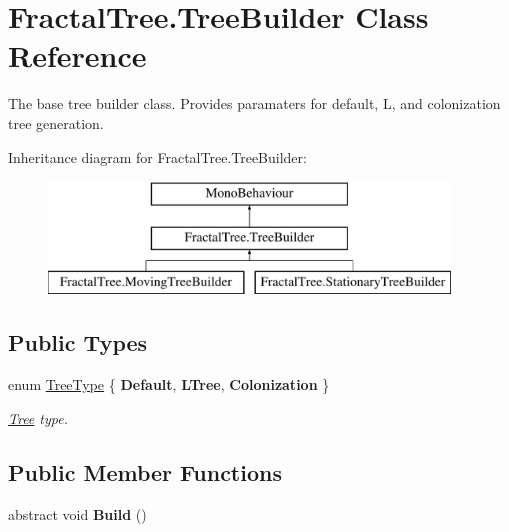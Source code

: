 \hypertarget{class_fractal_tree_1_1_tree_builder}{}\section{Fractal\+Tree.\+Tree\+Builder Class Reference}
\label{class_fractal_tree_1_1_tree_builder}


The base tree builder class. Provides paramaters for default, L, and colonization tree generation.  


Inheritance diagram for Fractal\+Tree.\+Tree\+Builder\+:\begin{figure}[H]
\begin{center}
\leavevmode
\includegraphics[height=3.000000cm]{class_fractal_tree_1_1_tree_builder}
\end{center}
\end{figure}
\subsection*{Public Types}
\begin{DoxyCompactItemize}
\item 
enum \hyperlink{class_fractal_tree_1_1_tree_builder_a955d67cfa976440cc427e591be74f979}{Tree\+Type} \{ {\bfseries Default}, 
{\bfseries L\+Tree}, 
{\bfseries Colonization}
 \}\begin{DoxyCompactList}\small\item\em \hyperlink{interface_fractal_tree_1_1_tree}{Tree} type. \end{DoxyCompactList}
\end{DoxyCompactItemize}
\subsection*{Public Member Functions}
\begin{DoxyCompactItemize}
\item 
\hypertarget{class_fractal_tree_1_1_tree_builder_a88adcd333ec7886c37d9810eab7fb8f0}{}\label{class_fractal_tree_1_1_tree_builder_a88adcd333ec7886c37d9810eab7fb8f0} 
abstract void {\bfseries Build} ()
\end{DoxyCompactItemize}
